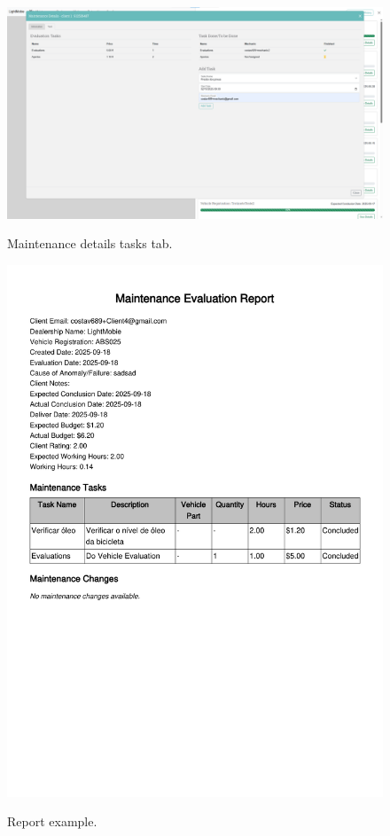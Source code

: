 \begin{figure}[htbp]
  \caption{Maintenance details tasks tab.}
  \centering
  \includegraphics[width=\textwidth]{figs/Implementation/workshopmanager/maintenanceDetailsTask}
  \label{fig:workshopmanagerMaintenanceDetailsTask}
\end{figure}


\begin{figure}[htbp]
  \caption{Report example.}
  \centering
  \includegraphics[width=\textwidth]{figs/Implementation/workshopmanager/report}
  \label{fig:report}
\end{figure}


